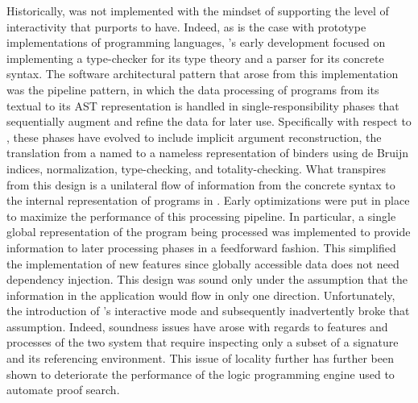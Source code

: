 Historically, \Beluga was not implemented with the mindset of supporting the level of interactivity that \Harpoon purports to have.
Indeed, as is the case with prototype implementations of programming languages, \Beluga's early development focused on implementing a type-checker for its type theory and a parser for its concrete syntax.
The software architectural pattern that arose from this implementation was the pipeline pattern, in which the data processing of programs from its textual to its \ac{AST} representation is handled in single-responsibility phases that sequentially augment and refine the data for later use.
Specifically with respect to \Beluga, these phases have evolved to include implicit argument reconstruction, the translation from a named to a nameless representation of binders using de Bruijn indices, normalization, type-checking, and totality-checking.
What transpires from this design is a unilateral flow of information from the concrete syntax to the internal representation of programs in \Beluga.
Early optimizations were put in place to maximize the performance of this processing pipeline.
In particular, a single global representation of the \Beluga program being processed was implemented to provide information to later processing phases in a feedforward fashion.
This simplified the implementation of new features since globally accessible data does not need dependency injection.
This design was sound only under the assumption that the information in the application would flow in only one direction.
Unfortunately, the introduction of \Beluga's interactive mode and subsequently \Harpoon inadvertently broke that assumption.
Indeed, soundness issues have arose with regards to features and processes of the two system that require inspecting only a subset of a signature and its referencing environment.
This issue of locality further has further been shown to deteriorate the performance of the logic programming engine used to automate proof search.


